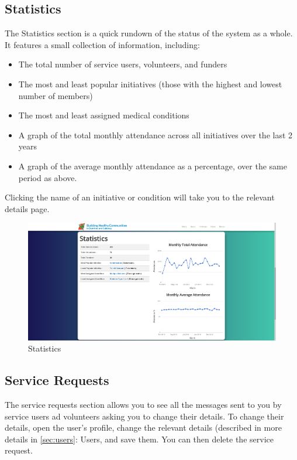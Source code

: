 \documentclass{bhcguides}
\begin{document}
\subsection{Statistics}
\label{ssec:statistics}

The Statistics section is a quick rundown of the status of the system as a whole. It features a small collection of information, including:

\begin{itemize}
	\item The total number of service users, volunteers, and funders
	\item The most and least popular initiatives (those with the highest and lowest number of members)
	\item The most and least assigned medical conditions
	\item A graph of the total monthly attendance across all initiatives over the last 2 years
	\item A graph of the average monthly attendance as a percentage, over the same period as above.
\end{itemize}

Clicking the name of an initiative or condition will take you to the relevant details page.

\begin{figure}[h!]
 \centerline{\includegraphics[width=\textwidth, height=\textheight, keepaspectratio]{homepage2.png}}
 \caption{Statistics}
 \label{fig:statistics}
\end{figure}

\subsection{Service Requests}
\label{ssec:servicerequests}

The service requests section allows you to see all the messages sent to you by service users ad volunteers asking you to change their details. To change their details, open the user's profile, change the relevant details (described in more details in \autoref{sec:users}: Users, and save them. You can then delete the service request.
\end{document}
